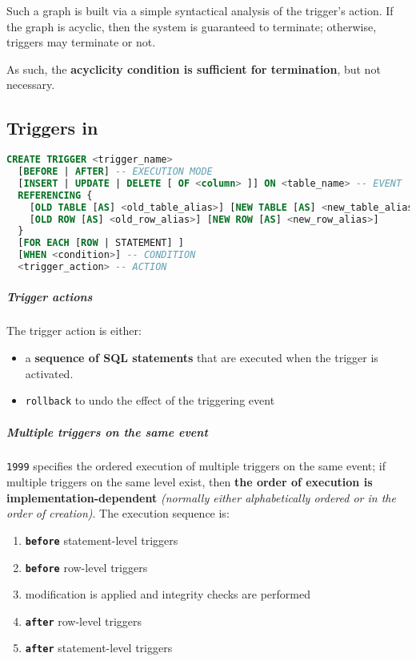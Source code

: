 \documentclass[english]{article}
\begin{document}
Such a graph is built via a simple syntactical analysis of the trigger's action.
If the graph is acyclic, then the system is guaranteed to terminate;
otherwise, triggers may terminate or not.

As such, the \textbf{acyclicity condition is sufficient for termination}, but not necessary.

\subsection{Triggers in \sql}

\begin{minipage}{\textwidth}
  \bigskip
  \begin{lstlisting}[language=SQL, caption={Trigger Syntax}, label={lst:trigger-syntax}, morekeywords={NEW, OLD, ROW, BEFORE, AFTER, REFERENCES, STATEMENT, EACH}]
CREATE TRIGGER <trigger_name>
  [BEFORE | AFTER] -- EXECUTION MODE
  [INSERT | UPDATE | DELETE [ OF <column> ]] ON <table_name> -- EVENT
  REFERENCING {
    [OLD TABLE [AS] <old_table_alias>] [NEW TABLE [AS] <new_table_alias>] |
    [OLD ROW [AS] <old_row_alias>] [NEW ROW [AS] <new_row_alias>]
  }
  [FOR EACH [ROW | STATEMENT] ]
  [WHEN <condition>] -- CONDITION
  <trigger_action> -- ACTION
\end{lstlisting}
\end{minipage}

\subparagraph*{Trigger actions}
The trigger action is either:

\begin{itemize}
  \item a \textbf{sequence of SQL statements} that are executed when the trigger is activated.
  \item \texttt{rollback} to undo the effect of the triggering event
\end{itemize}

\subparagraph*{Multiple triggers on the same event}
\sql \texttt{1999} specifies the ordered execution of multiple triggers on the same event;
if multiple triggers on the same level exist, then \textbf{the order of execution is implementation-dependent} \textit{(normally either alphabetically ordered or in the order of creation)}.
The execution sequence is:

\begin{enumerate}
  \item \textbf{\texttt{before}} statement-level triggers
  \item \textbf{\texttt{before}} row-level triggers
  \item modification is applied and integrity checks are performed
  \item \textbf{\texttt{after}} row-level triggers
  \item \textbf{\texttt{after}} statement-level triggers
\end{enumerate}
\end{document}
